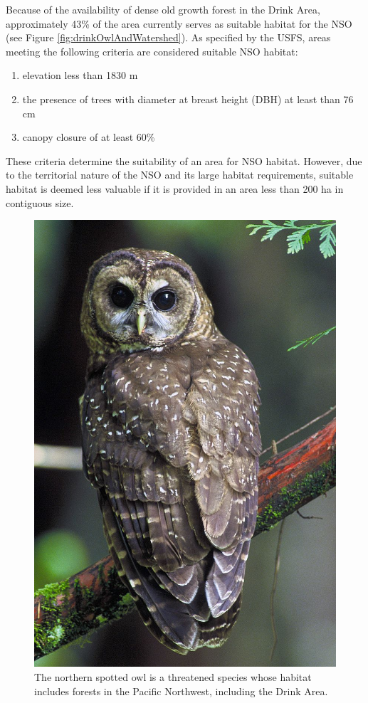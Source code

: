 Because of the availability of dense old growth forest in the Drink Area, approximately 43\% of the area currently serves as suitable habitat for the NSO (see Figure \ref{fig:drinkOwlAndWatershed}). As specified by the USFS, areas meeting the following criteria are considered suitable NSO habitat:
\begin{enumerate}
	\item elevation less than 1830 m
	\item the presence of trees with diameter at breast height (DBH) at least than 76 cm
	\item canopy closure of at least 60\%
\end{enumerate}
These criteria determine the suitability of an area for NSO habitat. However, due to the territorial nature of the NSO and its large habitat requirements, suitable habitat is deemed less valuable if it is provided in an area less than 200 ha in contiguous size.

\begin{figure}
\centering
\caption[Northern spotted owl]{The northern spotted owl is a threatened species whose habitat includes forests in the Pacific Northwest, including the Drink Area.}
\label{fig:nso}
\includegraphics[width=.2\textwidth]{../images/NorthernSpottedOwl_USFWS}
\end{figure}

